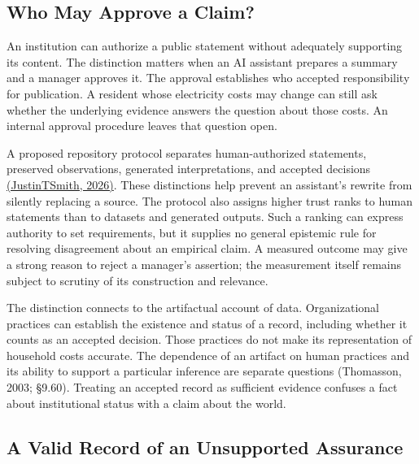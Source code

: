 \noindent \hypertarget{M09-who-may-approve-a-claim}{%
\subsection{Who May Approve a
Claim?}\label{M09-who-may-approve-a-claim}}

\noindent \noindent An institution can authorize a public statement without
adequately supporting its content. The distinction matters when an AI
assistant prepares a summary and a manager approves it. The approval
establishes who accepted responsibility for publication. A resident
whose electricity costs may change can still ask whether the underlying
evidence answers the question about those costs. An internal approval
procedure leaves that question open.

A proposed repository protocol separates human-authorized statements,
preserved observations, generated interpretations, and accepted
decisions
\href{https://github.com/JustinTSmith/Agent-Epistemic-Engine/tree/ae6ad9296c5a85b787978b121d76408197d5c3da}{(JustinTSmith,
2026)}. These distinctions help prevent an assistant's rewrite from
silently replacing a source. The protocol also assigns higher trust
ranks to human statements than to datasets and generated outputs. Such a
ranking can express authority to set requirements, but it supplies no
general epistemic rule for resolving disagreement about an empirical
claim. A measured outcome may give a strong reason to reject a manager's
assertion; the measurement itself remains subject to scrutiny of its
construction and relevance.

The distinction connects to the artifactual account of data.
Organizational practices can establish the existence and status of a
record, including whether it counts as an accepted decision. Those
practices do not make its representation of household costs accurate.
The dependence of an artifact on human practices and its ability to
support a particular inference are separate questions (Thomasson, 2003;
§9.60). Treating an accepted record as sufficient evidence confuses a
fact about institutional status with a claim about the world.

\hypertarget{M09-a-valid-record-of-an-unsupported-assurance}{%
\subsection{A Valid Record of an Unsupported
Assurance}\label{M09-a-valid-record-of-an-unsupported-assurance}}

